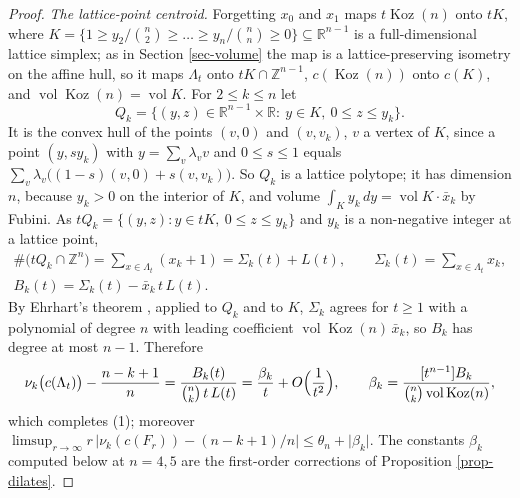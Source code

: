 \documentclass[11pt, a4paper, abstract=yes]{scrartcl}
\theoremstyle{definition}
\theoremstyle{remark}
\theoremstyle{plain}
\theoremstyle{remark}
\theoremstyle{plain}
\newcommand{\Koz}{\operatorname{Koz}}
\newcommand{\vol}{\operatorname{vol}}
\let\autocite\cite
\begin{document}
\begin{proof}
\emph{The lattice-point centroid.} Forgetting \(x_0\) and \(x_1\) maps \(t\Koz(n)\) onto \(tK\), where
\(K=\lbrace1\ge y_2/\binom n2\ge\dots\ge y_n/\binom nn\ge0\rbrace\subseteq\mathbb R^{n-1}\) is a
full-dimensional lattice simplex; as in Section \ref{sec-volume} the map is a lattice-preserving
isometry on the affine hull, so it maps \(\Lambda_t\) onto \(tK\cap\mathbb Z^{n-1}\), \(c(\Koz(n))\)
onto \(c(K)\), and \(\vol\Koz(n)=\vol K\). For \(2\le k\le n\) let
\begin{equation}\label{eq:Qk}
  Q_k=\bigl\lbrace(y,z)\in\mathbb R^{n-1}\times\mathbb R:\ y\in K,\ 0\le z\le y_k\bigr\rbrace .
\end{equation}
It is the convex hull of the points \((v,0)\) and \((v,v_k)\), \(v\) a vertex of \(K\), since a point
\((y,sy_k)\) with \(y=\sum_v\lambda_vv\) and \(0\le s\le1\) equals
\(\sum_v\lambda_v\bigl((1-s)(v,0)+s(v,v_k)\bigr)\). So \(Q_k\) is a lattice polytope; it has dimension
\(n\), because \(y_k>0\) on the interior of \(K\), and volume \(\int_Ky_k\,dy=\vol K\cdot\bar x_k\) by
Fubini. As \(tQ_k=\lbrace(y,z):y\in tK,\ 0\le z\le y_k\rbrace\) and \(y_k\) is a non-negative integer
at a lattice point,
\begin{equation}\label{eq:Sigmak}
\begin{gathered}
  \#\bigl(tQ_k\cap\mathbb Z^n\bigr)=\sum_{x\in\Lambda_t}(x_k+1)=\Sigma_k(t)+L(t),\qquad
  \Sigma_k(t)=\sum_{x\in\Lambda_t}x_k ,\\
  B_k(t)=\Sigma_k(t)-\bar x_k\,t\,L(t) .
\end{gathered}
\end{equation}
By Ehrhart's theorem \autocite{BeckRobins2015}, applied to \(Q_k\) and to \(K\), \(\Sigma_k\) agrees for
\(t\ge1\) with a polynomial of degree \(n\) with leading coefficient \(\vol\Koz(n)\,\bar x_k\), so
\(B_k\) has degree at most \(n-1\). Therefore
\begin{equation}\label{eq:betak}
  \nu_k\bigl(c(\Lambda_t)\bigr)-\frac{n-k+1}n=\frac{B_k(t)}{\binom nk\,t\,L(t)}
  =\frac{\beta_k}t+O\Bigl(\frac1{t^2}\Bigr),\qquad \beta_k=\frac{[t^{n-1}]B_k}{\binom nk\vol\Koz(n)} ,
\end{equation}
which completes (1); moreover
\(\limsup_{r\to\infty}r\,\lvert\nu_k(c(F_r))-(n-k+1)/n\rvert\le\theta_n+\lvert\beta_k\rvert\). The
constants \(\beta_k\) computed below at \(n=4,5\) are the first-order corrections of
Proposition \ref{prop-dilates}.


\end{proof}
\end{document}
